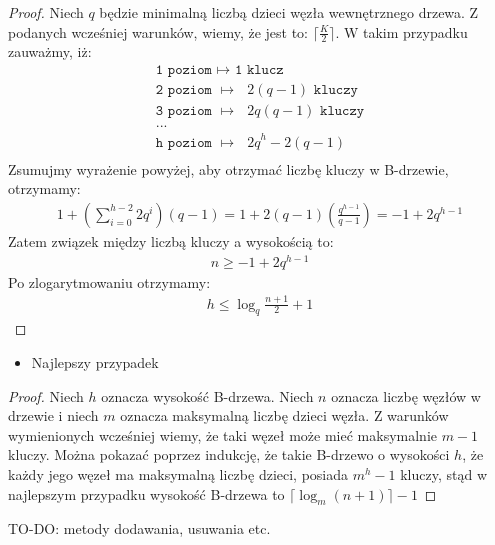 \begin{proof}
Niech $q$ będzie minimalną liczbą dzieci węzła wewnętrznego drzewa.
Z podanych wcześniej warunków, wiemy, że jest to: $\lceil\frac{K}{2}\rceil$.
W takim przypadku zauważmy, iż:
\begin{align*}
\texttt{1 poziom $\mapsto$ 1 klucz} \\
\texttt{2 poziom $\mapsto$ $2(q-1)$ kluczy} \\
\texttt{3 poziom $\mapsto$ $2q(q-1)$ kluczy} \\
\texttt{...} \\
\texttt{h poziom $\mapsto$ ${2q}^{h}-2(q-1)$} \\
\end{align*}
Zsumujmy wyrażenie powyżej, aby otrzymać liczbę kluczy w B-drzewie, otrzymamy:
\begin{align*}
1 + (\sum_{i=0}^{h-2}2{q}^{i})(q-1) = 1 + 2(q-1)(\frac{{q}^{h-1}}{q-1}) = -1 + 2{q}^{h-1}
\end{align*}
Zatem związek między liczbą kluczy a wysokością to:
\begin{align*}
n \geq -1 + 2{q}^{h-1}
\end{align*}
Po zlogarytmowaniu otrzymamy:
\begin{align*}
h \leq \log_{q}{\frac{n+1}{2}} + 1
\end{align*}
\end{proof}
\begin{itemize}
\item Najlepszy przypadek
\end{itemize}
\begin{proof}
Niech $h$ oznacza wysokość B-drzewa. Niech $n$ oznacza liczbę węzłów w drzewie i niech $m$ oznacza maksymalną liczbę dzieci węzła. Z warunków wymienionych wcześniej wiemy, że taki węzeł może mieć maksymalnie $m-1$ kluczy. Można pokazać poprzez indukcję, że takie B-drzewo o wysokości $h$, że każdy jego węzeł ma maksymalną liczbę dzieci, posiada ${m}^{h}-1$ kluczy, stąd w najlepszym przypadku wysokość B-drzewa to $\lceil\log_{m}{(n+1)}\rceil - 1$
\end{proof}
\newpage
TO-DO: metody dodawania, usuwania etc.